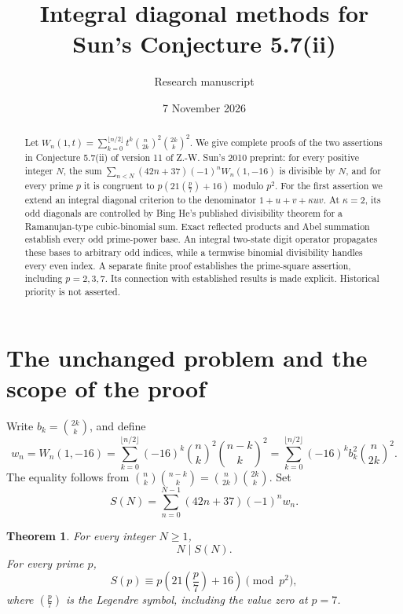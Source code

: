 \documentclass[11pt,a4paper]{article}
\title{Integral diagonal methods for\protect\\Sun's Conjecture 5.7(ii)}
\author{Research manuscript}
\date{7 November 2026}
\numberwithin{equation}{section}
\newtheorem{theorem}{Theorem}[section]
\theoremstyle{remark}
\begin{document}
\maketitle
\begin{abstract}
Let
\(W_n(1,t)=\sum_{k=0}^{\lfloor n/2\rfloor}
t^k\binom n{2k}^2\binom{2k}k^2\).
We give complete proofs of the two assertions in Conjecture 5.7(ii)
of version 11 of Z.-W. Sun's 2010 preprint: for every positive integer
\(N\), the sum \(\sum_{n<N}(42n+37)(-1)^nW_n(1,-16)\) is divisible
by \(N\), and for every prime \(p\) it is congruent to
\(p(21(\frac p7)+16)\) modulo \(p^2\).
For the first assertion we extend an integral diagonal criterion to
the denominator \(1+u+v+\kappa uv\). At \(\kappa=2\), its odd
diagonals are controlled by Bing He's published divisibility theorem
for a Ramanujan-type cubic-binomial sum. Exact reflected products and
Abel summation establish every odd prime-power base. An integral
two-state digit operator propagates these bases to arbitrary odd
indices, while a termwise binomial divisibility handles every even
index. A separate finite proof establishes the prime-square
assertion, including \(p=2,3,7\). Its connection with established
results is made explicit. Historical priority is not asserted.
\end{abstract}

\section{The unchanged problem and the scope of the proof}

Write \(b_k=\binom{2k}{k}\), and define
\begin{equation}\label{eq:original-sequence}
 w_n=W_n(1,-16)=\sum_{k=0}^{\lfloor n/2\rfloor}
 (-16)^k\binom nk^2\binom{n-k}k^2
 =\sum_{k=0}^{\lfloor n/2\rfloor}(-16)^k b_k^2\binom n{2k}^2.
\end{equation}
The equality follows from
\(\binom nk\binom{n-k}k=\binom n{2k}\binom{2k}k\).
Set
\begin{equation}\label{eq:target-sum}
 S(N)=\sum_{n=0}^{N-1}(42n+37)(-1)^n w_n.
\end{equation}

\begin{theorem}\label{thm:main}
For every integer \(N\ge1\),
\begin{equation}\label{eq:main-allN}
                         N\mid S(N).
\end{equation}
For every prime \(p\),
\begin{equation}\label{eq:main-p2}
 S(p)\equiv p\left(21\left(\frac p7\right)+16\right)\pmod{p^2},
\end{equation}
where \((\frac p7)\) is the Legendre symbol, including the value
zero at \(p=7\).
\end{theorem}
\end{document}
